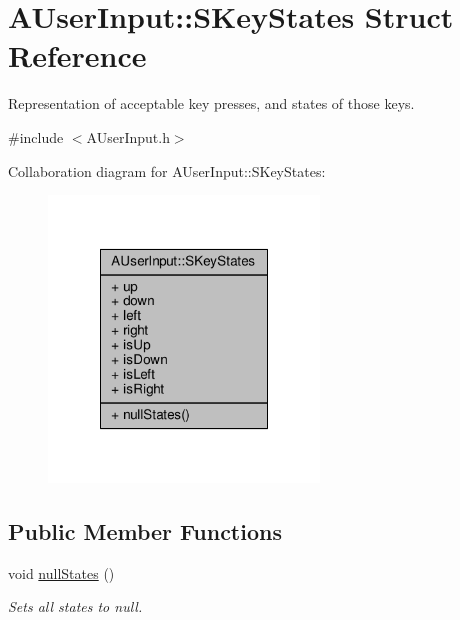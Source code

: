 \hypertarget{structAUserInput_1_1SKeyStates}{\section{A\-User\-Input\-:\-:S\-Key\-States Struct Reference}
\label{structAUserInput_1_1SKeyStates}
}


Representation of acceptable key presses, and states of those keys.  




{\ttfamily \#include $<$A\-User\-Input.\-h$>$}



Collaboration diagram for A\-User\-Input\-:\-:S\-Key\-States\-:\nopagebreak
\begin{figure}[H]
\begin{center}
\leavevmode
\includegraphics[width=204pt]{structAUserInput_1_1SKeyStates__coll__graph}
\end{center}
\end{figure}
\subsection*{Public Member Functions}
\begin{DoxyCompactItemize}
\item 
void \hyperlink{structAUserInput_1_1SKeyStates_a15f162c6a5b63e222fc463e0ac561798}{null\-States} ()
\begin{DoxyCompactList}\small\item\em Sets all states to null. \end{DoxyCompactList}\end{DoxyCompactItemize}
